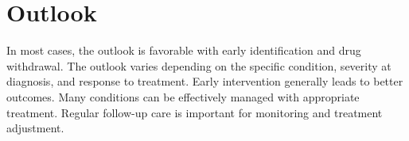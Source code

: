 \section{Outlook}
In most cases, the outlook is favorable with early identification and drug withdrawal. The outlook varies depending on the specific condition, severity at diagnosis, and response to treatment. Early intervention generally leads to better outcomes. Many conditions can be effectively managed with appropriate treatment. Regular follow-up care is important for monitoring and treatment adjustment.

